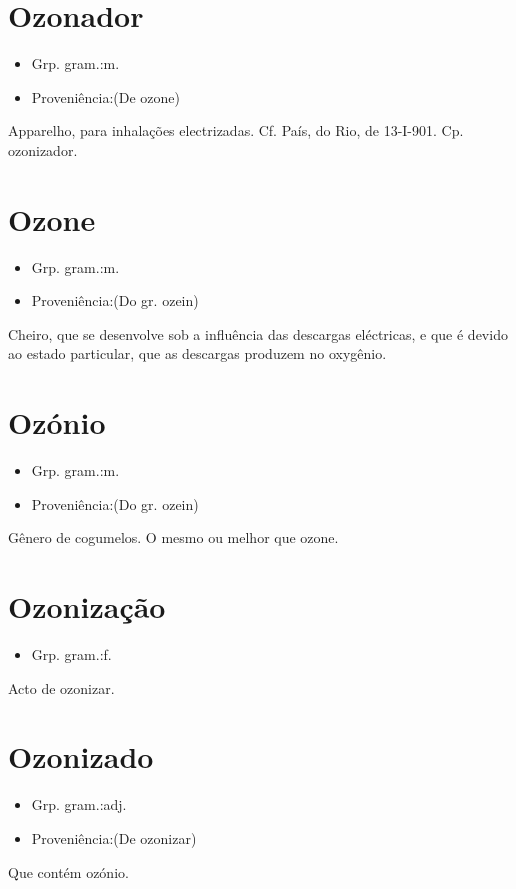 \section{Ozonador}
\begin{itemize}
\item {Grp. gram.:m.}
\end{itemize}
\begin{itemize}
\item {Proveniência:(De \textunderscore ozone\textunderscore )}
\end{itemize}
Apparelho, para inhalações electrizadas. Cf. \textunderscore País\textunderscore , do Rio, de 13-I-901. Cp. \textunderscore ozonizador\textunderscore .
\section{Ozone}
\begin{itemize}
\item {Grp. gram.:m.}
\end{itemize}
\begin{itemize}
\item {Proveniência:(Do gr. \textunderscore ozein\textunderscore )}
\end{itemize}
Cheiro, que se desenvolve sob a influência das descargas eléctricas, e que é devido ao estado particular, que as descargas produzem no oxygênio.
\section{Ozónio}
\begin{itemize}
\item {Grp. gram.:m.}
\end{itemize}
\begin{itemize}
\item {Proveniência:(Do gr. \textunderscore ozein\textunderscore )}
\end{itemize}
Gênero de cogumelos.
O mesmo ou melhor que \textunderscore ozone\textunderscore .
\section{Ozonização}
\begin{itemize}
\item {Grp. gram.:f.}
\end{itemize}
Acto de ozonizar.
\section{Ozonizado}
\begin{itemize}
\item {Grp. gram.:adj.}
\end{itemize}
\begin{itemize}
\item {Proveniência:(De \textunderscore ozonizar\textunderscore )}
\end{itemize}
Que contém ozónio.

